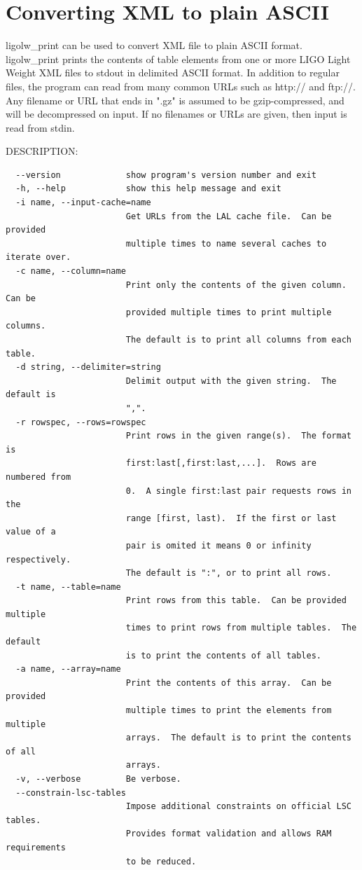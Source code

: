 \section{Converting XML to plain ASCII}
ligolw\_print can be used to convert XML file to plain ASCII format. ligolw\_print prints the contents of table elements from one or more LIGO Light Weight XML files to stdout in delimited ASCII format.  In addition to regular files, the
program can read from many common URLs such as http:// and ftp://.  Any filename or URL that ends in ".gz" is assumed to be gzip-compressed, and will be decompressed on input.  If no filenames or URLs are given, then input is read from stdin.


DESCRIPTION:
\begin{verbatim}
  --version             show program's version number and exit
  -h, --help            show this help message and exit
  -i name, --input-cache=name
                        Get URLs from the LAL cache file.  Can be provided
                        multiple times to name several caches to iterate over.
  -c name, --column=name
                        Print only the contents of the given column.  Can be
                        provided multiple times to print multiple columns.
                        The default is to print all columns from each table.
  -d string, --delimiter=string
                        Delimit output with the given string.  The default is
                        ",".
  -r rowspec, --rows=rowspec
                        Print rows in the given range(s).  The format is
                        first:last[,first:last,...].  Rows are numbered from
                        0.  A single first:last pair requests rows in the
                        range [first, last).  If the first or last value of a
                        pair is omited it means 0 or infinity respectively.
                        The default is ":", or to print all rows.
  -t name, --table=name
                        Print rows from this table.  Can be provided multiple
                        times to print rows from multiple tables.  The default
                        is to print the contents of all tables.
  -a name, --array=name
                        Print the contents of this array.  Can be provided
                        multiple times to print the elements from multiple
                        arrays.  The default is to print the contents of all
                        arrays.
  -v, --verbose         Be verbose.
  --constrain-lsc-tables
                        Impose additional constraints on official LSC tables.
                        Provides format validation and allows RAM requirements
                        to be reduced.
\end{verbatim}


